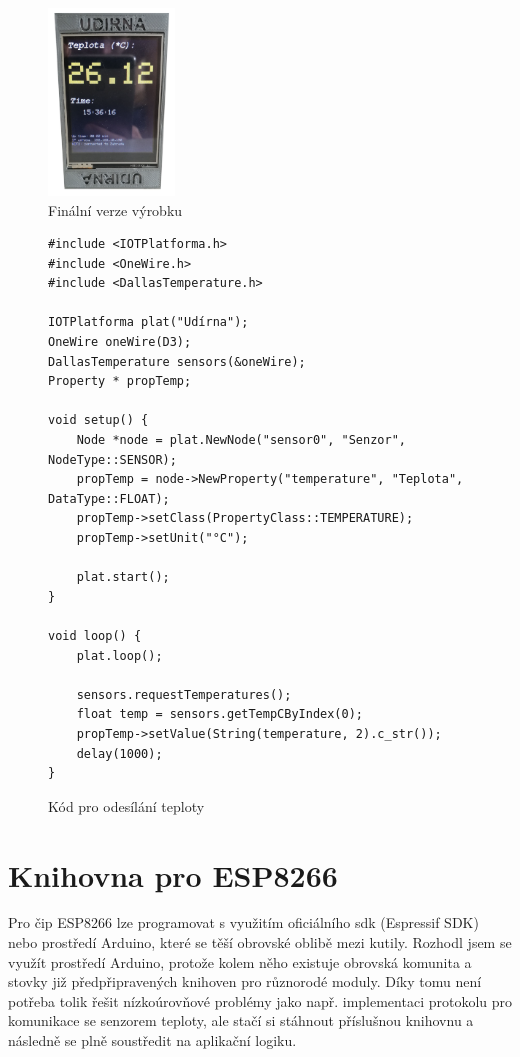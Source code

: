 \begin{figure}[htbp]
    \centering
    \includegraphics[width=0.3\textwidth]{img/smokehouse.png}
    \caption{\label{smokehouse}Finální verze výrobku}
\end{figure}

\begin{figure}[h!tb]
    \begin{verbatim}
#include <IOTPlatforma.h>
#include <OneWire.h>
#include <DallasTemperature.h>

IOTPlatforma plat("Udírna");
OneWire oneWire(D3);
DallasTemperature sensors(&oneWire);
Property * propTemp;

void setup() {
    Node *node = plat.NewNode("sensor0", "Senzor", NodeType::SENSOR);
    propTemp = node->NewProperty("temperature", "Teplota", DataType::FLOAT);
    propTemp->setClass(PropertyClass::TEMPERATURE);
    propTemp->setUnit("°C");

    plat.start();
}

void loop() {
    plat.loop();

    sensors.requestTemperatures();
    float temp = sensors.getTempCByIndex(0);
    propTemp->setValue(String(temperature, 2).c_str());
    delay(1000);
}
\end{verbatim}
    \caption{\label{code}Kód pro odesílání teploty}
\end{figure}

\section{Knihovna pro ESP8266}
\label{library}
Pro čip ESP8266 lze programovat s využitím oficiálního sdk (Espressif SDK) nebo prostředí Arduino, které se těší obrovské oblibě mezi kutily. Rozhodl jsem se využít prostředí Arduino, protože kolem něho existuje obrovská komunita a stovky již předpřipravených knihoven pro různorodé moduly. Díky tomu není potřeba tolik řešit nízkoúrovňové problémy jako např. implementaci protokolu pro komunikace se senzorem teploty, ale stačí si stáhnout příslušnou knihovnu a následně se plně soustředit na aplikační logiku.

